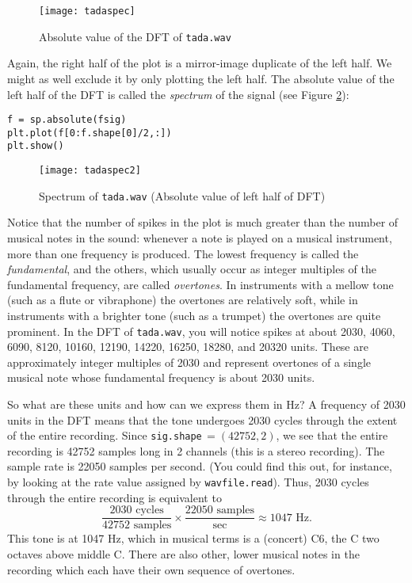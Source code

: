 \begin{figure}[ht]\caption{Absolute value of the DFT of \texttt{tada.wav}}\label{tadaspec}\centering\texttt{[image: tadaspec]}\end{figure}
Again, the right half of the plot is a mirror-image duplicate of the left half.
We might as well exclude it by only plotting the left half.
The absolute value of the left half of  the DFT is called the \emph{spectrum} of the signal (see Figure \ref{tadaspec2}):
\begin{lstlisting}
f = sp.absolute(fsig)
plt.plot(f[0:f.shape[0]/2,:])
plt.show()
\end{lstlisting}
\begin{figure}[ht]\caption{Spectrum of \texttt{tada.wav} (Absolute value of left half of DFT)}\label{tadaspec2}\centering\texttt{[image: tadaspec2]}\end{figure}
Notice that the number of spikes in the plot is much greater than the number of musical notes in the sound: whenever a note is played on a musical instrument, more than one frequency is produced.
The lowest frequency is called the \emph{fundamental}, and the others, which usually occur as integer multiples of the fundamental frequency, are called \emph{overtones}.
In instruments with a mellow tone (such as a flute or vibraphone) the overtones are relatively soft, while in instruments with a brighter tone (such as a trumpet) the overtones are quite prominent.
In the DFT of \texttt{tada.wav}, you will notice spikes at about 2030, 4060, 6090, 8120, 10160, 12190, 14220, 16250, 18280, and 20320 units.
These are approximately integer multiples of 2030 and represent overtones of a single musical note whose fundamental frequency is about 2030 units.

So what are these units and how can we express them in Hz?
A frequency of 2030 units in the DFT means that the tone undergoes 2030 cycles through the extent of the entire recording.
Since \texttt{sig.shape}$\, = (42752, 2)$, we see that the entire recording is 42752 samples long in 2 channels (this is a stereo recording).
The sample rate is 22050 samples per second.
(You could find this out, for instance, by looking at the rate value assigned by \texttt{wavfile.read}).
Thus, 2030 cycles through the entire recording is equivalent to
$$\frac{2030\text{ cycles}}{42752\text{ samples}} \times \frac{22050\text{ samples}}{\text{sec}} \approx 1047 \text{ Hz}.$$
This tone is at 1047 Hz, which in musical terms is a (concert) C6, the C two octaves above middle C.
There are also other, lower musical notes in the recording which each have their own sequence of overtones.

